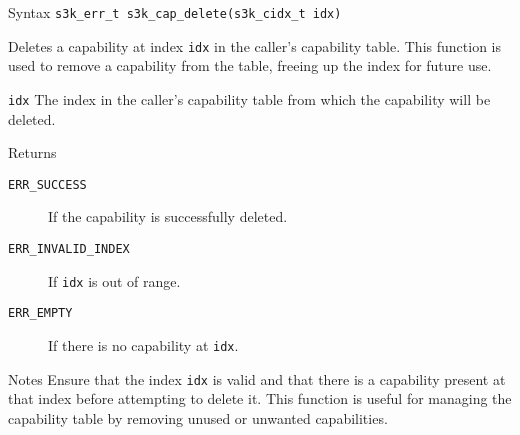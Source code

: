 \documentclass[a4paper,11pt]{article}
\newcommand{\syscall}[1]{\texttt{#1}}
\newenvironment{syscalldoc}[1]{
  \begin{tcolorbox}[breakable,title=\subsection{\syscall{#1}}]
  \begin{description}[leftmargin=!,style=nextline,noitemsep]
}{
  \end{description}
  \end{tcolorbox}
}
\begin{document}
\begin{syscalldoc}{s3k\_cap\_delete}
  \item[Syntax] \lstinline{s3k_err_t s3k_cap_delete(s3k_cidx_t idx)}

  \item[Description] Deletes a capability at index \verb|idx| in the caller's capability table. This function is used to remove a capability from the table, freeing up the index for future use.

  \item[Parameters]
    \begin{description}
      \item[]
      \item[\texttt{idx}] The index in the caller's capability table from which the capability will be deleted.
    \end{description}

  \item[Returns]
    \begin{description}
      \item[]
      \item[\texttt{ERR\_SUCCESS}] If the capability is successfully deleted.
      \item[\texttt{ERR\_INVALID\_INDEX}] If \verb|idx| is out of range.
      \item[\texttt{ERR\_EMPTY}] If there is no capability at \verb|idx|.
    \end{description}

  \item[Notes] Ensure that the index \verb|idx| is valid and that there is a capability present at that index before attempting to delete it. This function is useful for managing the capability table by removing unused or unwanted capabilities.
\end{syscalldoc}
\end{document}
